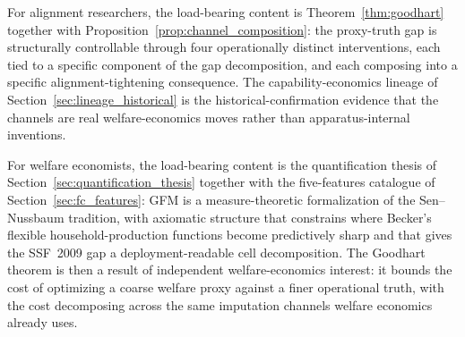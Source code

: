 For alignment researchers, the load-bearing content is
Theorem~\ref{thm:goodhart} together with
Proposition~\ref{prop:channel_composition}: the proxy-truth
gap is structurally controllable through four operationally
distinct interventions, each tied to a specific component of
the gap decomposition, and each composing into a specific
alignment-tightening consequence.  The capability-economics
lineage of Section~\ref{sec:lineage_historical} is the
historical-confirmation evidence that the channels are real
welfare-economics moves rather than apparatus-internal
inventions.

For welfare economists, the load-bearing content is the
quantification thesis of
Section~\ref{sec:quantification_thesis} together with the
five-features catalogue of Section~\ref{sec:fc_features}: GFM
is a measure-theoretic formalization of the Sen--Nussbaum
tradition, with axiomatic structure that constrains where
Becker's flexible household-production functions become
predictively sharp and that gives the SSF~2009 gap a
deployment-readable cell decomposition.  The Goodhart theorem
is then a result of independent welfare-economics interest:
it bounds the cost of optimizing a coarse welfare proxy
against a finer operational truth, with the cost decomposing
across the same imputation channels welfare economics already
uses.
